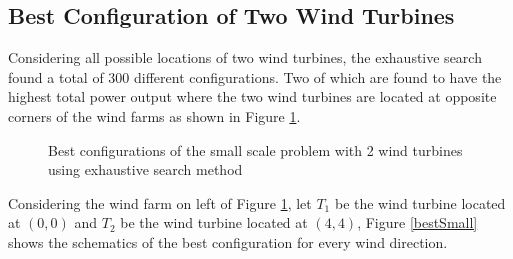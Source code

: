    \subsection{Best Configuration of Two Wind Turbines}
    
    Considering all possible locations of two wind turbines, the exhaustive search found a total of 300 different configurations. Two of which are found to have the highest total power output where the two wind turbines are located at opposite corners of the wind farms as shown in Figure \ref{small2}.
    
    \begin{figure}[h]
        \centering
        \qquad
        \caption{Best configurations of the small scale problem with 2 wind turbines using exhaustive search method}
        \label{small2}
    \end{figure}
    
    Considering the wind farm on left of Figure \ref{small2}, let $T_1$ be the wind turbine located at $(0,0)$ and $T_2$ be the wind turbine located at $(4,4)$, Figure \ref{bestSmall} shows the schematics of the best configuration for every wind direction.
    
